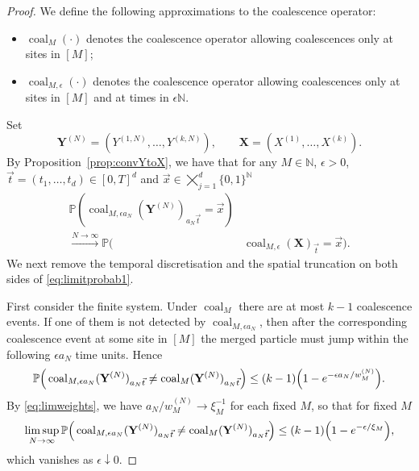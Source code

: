 \documentclass[10pt,a4paper]{amsart}
\newcommand{\bN}{\ensuremath{\mathbb{N}}}
\newcommand{\bP}{\ensuremath{\mathbb{P}}}
\begin{document}
\begin{proof}
	We define the following approximations to the coalescence operator:
	\begin{itemize}
		\item \(\operatorname{coal}_M(\cdot)\) denotes the coalescence operator allowing coalescences only at sites in $[M]$;
		\item \(\operatorname{coal}_{M,\epsilon}(\cdot)\) denotes the coalescence operator allowing coalescences only at sites in $[M]$ and at times in $\epsilon\bN$.
	\end{itemize}
	Set
	\[
	\mathbf{Y}^{(N)}=(Y^{(1,N)},\dots,Y^{(k,N)}),\qquad \mathbf{X}=(X^{(1)},\dots,X^{(k)}).
	\]
	By Proposition~\ref{prop:convYtoX}, we have that for any $M\in\mathbb{N}$, $\epsilon>0$, $\vec{t}=(t_1,\dots,t_d)\in[0,T]^d$ and $\vec{x}\in \bigtimes_{j=1}^d \{0,1\}^{\bN}$
	\begin{equation}\label{eq:limitprobab1}
		\begin{aligned}
		\bP\left(\operatorname{coal}_{M,\epsilon a_N}(\mathbf{Y}^{(N)})_{a_N\vec{t}}=\vec{x}\right)&\\
		 \overset{N\to\infty}{\longrightarrow}\bP\Big(&\operatorname{coal}_{M,\epsilon}(\mathbf{X})_{\vec{t}}=\vec{x}\Big).
		\end{aligned}
	\end{equation}
	We next remove the temporal discretisation and the spatial truncation on both sides of \eqref{eq:limitprobab1}.

	First consider the finite system. Under $\operatorname{coal}_{M}$ there are at most $k-1$ coalescence events. If one of them is not detected by $\operatorname{coal}_{M,\epsilon a_N}$, then after the corresponding coalescence event at some site in $[M]$ the merged particle must jump within the following $\epsilon a_N$ time units. Hence
	\begin{equation}\label{eq:finite-time-disc}
		\bP\Big( \operatorname{coal}_{M,\epsilon a_N}(\mathbf{Y}^{(N)})_{a_N\vec{t}}\neq \operatorname{coal}_{M}(\mathbf{Y}^{(N)})_{a_N\vec{t}} \Big)
		\leq (k-1)\Big(1-\textup{e}^{-\epsilon a_N/w_M^{(N)}}\Big).
	\end{equation}
	By \eqref{eq:limweights}, we have $a_N/w_M^{(N)}\to \xi_M^{-1}$ for each fixed $M$, so that for fixed $M$
	\begin{equation}\label{eq:finite-time-disc-limit}
		\limsup_{N\to\infty}\bP\Big( \operatorname{coal}_{M,\epsilon a_N}(\mathbf{Y}^{(N)})_{a_N\vec{t}}\neq \operatorname{coal}_{M}(\mathbf{Y}^{(N)})_{a_N\vec{t}} \Big)
		\leq (k-1)\Big(1-\textup{e}^{-\epsilon/\xi_M}\Big),
	\end{equation}
	which vanishes as $\epsilon\downarrow 0$.


\end{proof}
\end{document}
